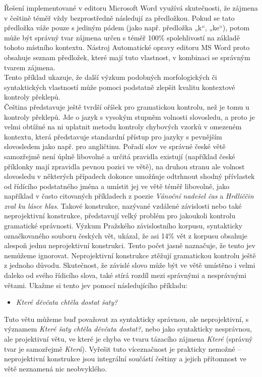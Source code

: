 \documentclass[]{../../metanetpaper}
\begin{document}
\begin{multicols}{2}
Řešení implementované v editoru Microsoft Word využívá skutečnosti, že zájmena v češtině téměř vždy bezprostředně následují za předložkou. Pokud se tato předložka váže pouze s jediným pádem (jako např. předložka „k“, „ke“), potom může být správný tvar zájmena určen s téměř 100\% spolehlivostí na základě tohoto místního kontextu. Nástroj Automatické opravy editoru MS Word proto obsahuje seznam předložek, které mají tuto vlastnost, v kombinaci se správným tvarem zájmena.\\
Tento příklad ukazuje, že další výzkum podobných morfologických či syntaktických vlastností může pomoci podstatně zlepšit kvalitu kontextové kontroly překlepů.\\
Čeština představuje ještě tvrdší oříšek pro gramatickou kontrolu, než je tomu u kontroly překlepů. Jde o jazyk s vysokým stupněm volnosti slovosledu, a proto je velmi obtížné na ni uplatnit metodu kontroly chybových vzorků v omezeném kontextu, která představuje standardní přístup pro jazyky s pevnějším slovosledem jako např. pro angličtinu. Pořadí slov ve správné české větě samozřejmě není úplně libovolné a určitá pravidla existují (například české příklonky mají zpravidla pevnou pozici ve větě), na druhou stranu ale volnost slovosledu v některých případech dokonce umožňuje odtrhnout shodný přívlastek od řídícího podstatného jména a umístit jej ve větě téměř libovolně, jako například v často citovaných příkladech z poezie \textit{Vánoční nadešel čas} a \textit{Hrdliččin zval ku lásce hlas}. Takové konstrukce, nazývané vzdálené závislosti nebo také neprojektivní konstrukce, představují velký problém pro jakoukoli kontrolu gramatické správnosti. Výzkum Pražského závislostního korpusu, syntakticky označkovaného souboru českých vět, ukázal, že asi 14\% vět z korpusu obsahuje alespoň jednu neprojektivní konstrukci. Tento počet jasně naznačuje, že tento jev nemůžeme ignorovat. Neprojektivní konstrukce ztěžují gramatickou kontrolu ještě z jednoho důvodu. Skutečnost, že závislé slovo může být ve větě umístěno i velmi daleko od svého řídicího slova, také stírá rozdíl mezi správnými a nesprávnými větami. Ukažme si tento jev pomocí následujícího příkladu:
\begin{itemize}
\item[] \textit{Které děvčata chtěla dostat šaty?}
\end{itemize}
Tuto větu můžeme buď považovat za syntakticky správnou, ale neprojektivní, s významem \textit{Které šaty chtěla děvčata dostat?}, nebo jako syntakticky nesprávnou, ale projektivní větu, ve které je chyba ve tvaru tázacího zájmena \textit{Které} (správný tvar je samozřejmě \textit{Která}). Vyřešit tuto víceznačnost je prakticky nemožné – neprojektivní konstrukce jsou integrální součástí češtiny a jejich přítomnost ve větě neznamená nic neobvyklého.

\end{multicols}
\end{document}
